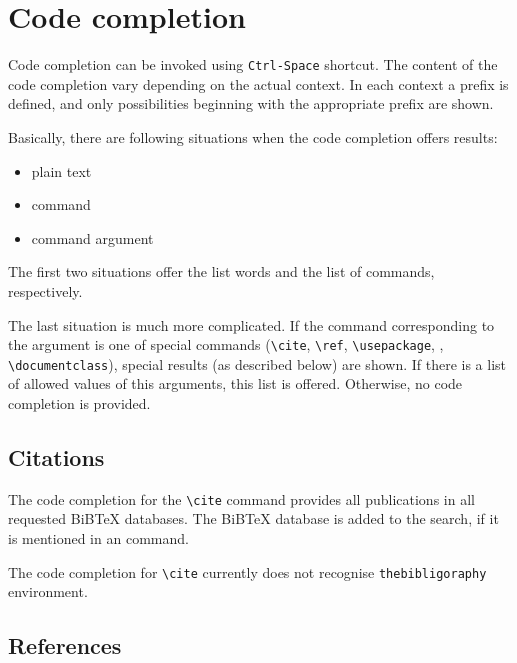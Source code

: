 \documentclass{article}
\begin{document}
\label{}

%

\section{Code completion}

\label{sec:completion}

Code completion can be invoked using \verb+Ctrl-Space+ shortcut. The content
of the code completion vary depending on the actual context. In each context
a prefix is defined, and only possibilities beginning with the appropriate
prefix are shown.

Basically, there are following situations when the code completion offers results:
\begin{itemize}
\item{plain text}
\item{command}
\item{command argument}
\end{itemize}

The first two situations offer the list words and the list of commands, respectively.

The last situation is much more complicated. If the command corresponding to
the argument is one of special commands (\verb+\cite+, \verb+\ref+,
\verb+\usepackage+, , \verb+\documentclass+),
special results (as described below) are shown. If there is a list of allowed
values of this arguments, this list is offered. Otherwise, no code completion
is provided.


\subsection{Citations}

\label{ssec:citations}

The code completion for the \verb+\cite+ command provides all publications in all
requested BiBTeX databases. The BiBTeX database is added to the search, if it is
mentioned in an \verb++ command.

The code completion for \verb+\cite+ currently does not recognise \verb+thebibligoraphy+
environment.

\subsection{References}
\end{document}

